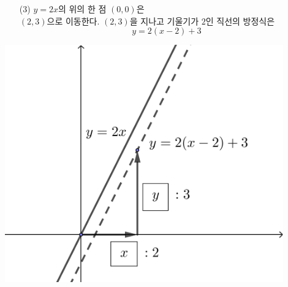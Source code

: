 \documentclass{oblivoir}
\begin{document}
\begin{mdframed}\begin{minipage}{0.49\textwidth}
\begin{enumerate}[topsep=0pt]
\item[(3)]
\(y=2x\)의 위의 한 점 \((0,0)\)은\\
\((2,3)\)으로 이동한다.
\((2,3)\)을 지나고 기울기가 \(2\)인 직선의 방정식은
\[y=2(x-2)+3\]
\end{enumerate}
\end{minipage}
\begin{minipage}{0.49\textwidth}
\begin{center}
\includegraphics[width=0.9\textwidth]{ttranslate_2-3}
\end{center}
\end{minipage}\end{mdframed}
\end{document}
